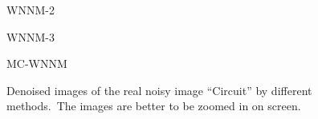 \begin{figure}
{\begin{minipage}[t]{0.19\textwidth}
{\footnotesize WNNM-2 }
\end{minipage}
\begin{minipage}[t]{0.19\textwidth}
\centering
{}
{\footnotesize WNNM-3 }
\end{minipage}
\begin{minipage}[t]{0.19\textwidth}
\centering
{}
{\footnotesize MC-WNNM }
\end{minipage}
}
    \caption{Denoised images of the real noisy image ``Circuit'' \cite{ncwebsite} by different methods.\ The images are better to be zoomed in on screen.}
    \label{fig4-11}
\end{figure}


